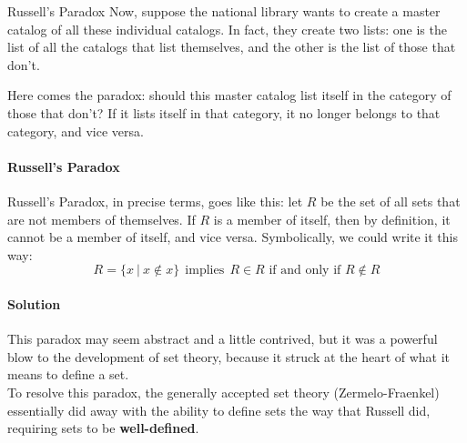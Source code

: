 \begin{proc}{Russell's Paradox}
Now, suppose the national library wants to create a master catalog of all these individual catalogs.  In fact, they create two lists: one is the list of all the catalogs that list themselves, and the other is the list of those that don't.

Here comes the paradox: should this master catalog list itself in the category of those that don't?  If it lists itself in that category, it no longer belongs to that category, and vice versa.\\

\paragraph{Russell's Paradox} Russell's Paradox, in precise terms, goes like this: let $R$ be the set of all sets that are not members of themselves.  If $R$ is a member of itself, then by definition, it cannot be a member of itself, and vice versa.  Symbolically, we could write it this way:
\[R = \{x\ |\ x \notin x\} \ \ \textrm{implies}\ \ R \in R \textrm{ if and only if } R \notin R\]

\paragraph{Solution} This paradox may seem abstract and a little contrived, but it was a powerful blow to the development of set theory, because it struck at the heart of what it means to define a set.\\

To resolve this paradox, the generally accepted set theory (Zermelo-Fraenkel) essentially did away with the ability to define sets the way that Russell did, requiring sets to be \textbf{well-defined}.
\end{proc}

